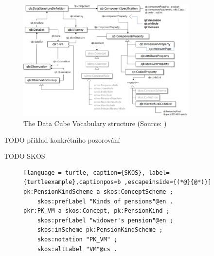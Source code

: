 \begin{figure}[h]
\centering
\includegraphics[width=0.8\textwidth]{img/qbstructure.png}
\caption{The Data Cube Vocabulary structure (Source: \cite{dcv2014})}
\label{qbstructureimg}
\end{figure}

TODO příklad konkrétního pozorování

TODO SKOS



\begin{figure}[h]
\begin{lstlisting}[language = turtle, caption={SKOS}, label={turtleexample},captionpos=b ,escapeinside={(*@}{@*)}]
pk:PensionKindScheme a skos:ConceptScheme ; 
    skos:prefLabel "Kinds of pensions"@en .
pkr:PK_VM a skos:Concept, pk:PensionKind ;
    skos:prefLabel "widower's pension"@en ;
    skos:inScheme pk:PensionKindScheme ;
    skos:notation "PK_VM" ;
    skos:altLabel "VM"@cs .
\end{lstlisting}
\end{figure}

